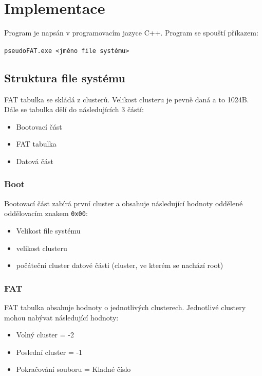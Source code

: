 \documentclass[12pt, a4paper]{article}
\begin{document}
\section{Implementace}

    Program je napsán v programovacím jazyce C++. Program se spouští příkazem:

    \vspace{0.5cm}
    \centerline{ \texttt{pseudoFAT.exe \textless jméno file systému\textgreater }} 
    \vspace{0.5cm}

    \subsection{Struktura file systému}
        
        FAT tabulka se skládá z clusterů. Velikost clusteru je pevně daná a to 1024B. Dále se tabulka dělí do následujících 3 částí:

        \begin{itemize}
            \item Bootovací část
            \item FAT tabulka
            \item Datová část
        \end{itemize}

        \subsubsection{Boot}
            Bootovací část zabírá první cluster a obsahuje následující hodnoty oddělené oddělovacím znakem \texttt{0x00}:

            \begin{itemize}
                \item Velikost file systému
                \item velikost clusteru
                \item počáteční cluster datové části (cluster, ve kterém se nachází root)
            \end{itemize}    

        \subsubsection{FAT}
            FAT tabulka obsahuje hodnoty o jednotlivých clusterech. Jednotlivé clustery mohou nabývat následující hodnoty:

            \begin{itemize}
                \item Volný cluster = -2
                \item Poslední cluster = -1
                \item Pokračování souboru = Kladné číslo
            \end{itemize}
\end{document}
